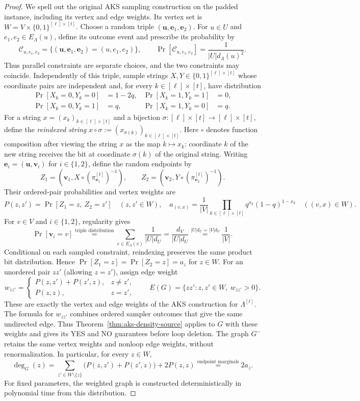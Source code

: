 \begin{proof}
We spell out the original AKS sampling construction
\cite[proof of Theorem~3.1]{AKS2011} on the padded instance,
including its vertex and edge weights.
Its vertex set is $W=V\times\{0,1\}^{[\ell]\times[t]}$.
Choose a random triple $(\mathbf u,\mathbf e_1,\mathbf e_2)$.
For $u\in U$ and $e_1,e_2\in E_\Lambda(u)$, define its outcome event
and prescribe its probability by
\[
\mathcal C_{u,e_1,e_2}
 =\{(\mathbf u,\mathbf e_1,\mathbf e_2)=(u,e_1,e_2)\},
 \qquad \Pr[\mathcal C_{u,e_1,e_2}]=\frac{1}{|U|d_\Lambda(u)^2}.
\]
Thus parallel constraints are separate choices, and the two constraints
may coincide. Independently of this triple, sample strings
$X,Y\in\{0,1\}^{[\ell]\times[t]}$ whose coordinate pairs are independent
and, for every $k\in[\ell]\times[t]$, have distribution
\[
\begin{aligned}
 \Pr[X_k=0,Y_k=0]&=1-2q,& \Pr[X_k=1,Y_k=1]&=0,\\
 \Pr[X_k=0,Y_k=1]&=q,& \Pr[X_k=1,Y_k=0]&=q.
\end{aligned}
\]
For a string $x=(x_k)_{k\in[\ell]\times[t]}$ and a bijection
$\sigma:[\ell]\times[t]\to[\ell]\times[t]$, define the \emph{reindexed string}
$x\circ\sigma:=(x_{\sigma(k)})_{k\in[\ell]\times[t]}$.
Here $\circ$ denotes function composition after viewing the string $x$
as the map $k\mapsto x_k$: coordinate $k$ of the new string receives
the bit at coordinate $\sigma(k)$ of the original string.
Writing $\mathbf e_i=(\mathbf u,\mathbf v_i)$ for $i\in\{1,2\}$,
define the random endpoints by
\[
 Z_1=(\mathbf v_1,X\circ(\pi_{\mathbf e_1}^{[t]})^{-1}),\qquad
 Z_2=(\mathbf v_2,Y\circ(\pi_{\mathbf e_2}^{[t]})^{-1}).
\]
Their ordered-pair probabilities and vertex weights are
\[
P(z,z')=\Pr[Z_1=z,\ Z_2=z']\quad(z,z'\in W),\quad a_{(v,x)}=\frac{1}{|V|}
 \prod_{k\in[\ell]\times[t]}q^{x_k}(1-q)^{1-x_k}
 \quad((v,x)\in W).
\]
For $v\in V$ and $i\in\{1,2\}$, regularity gives
\[
 \Pr[\mathbf v_i=v]
 \overset{\text{triple distribution}}{=}
 \sum_{e\in E_\Lambda(v)}\frac1{|U|d_U}
 =\frac{d_V}{|U|d_U}
 \overset{|U|d_U=|V|d_V}{=}\frac1{|V|}.
\]
Conditional on each sampled constraint, reindexing preserves the
same product bit distribution. Hence
$\Pr[Z_1=z]=\Pr[Z_2=z]=a_z$ for $z\in W$.
For an unordered pair $zz'$ (allowing $z=z'$), assign edge weight
\[
 w_{zz'}=
 \begin{cases}
  P(z,z')+P(z',z),&z\ne z',\\
  P(z,z),&z=z',
 \end{cases}
 \qquad
 E(G)=\{zz':z,z'\in W,\ w_{zz'}>0\}.
\]
These are exactly the vertex and edge weights of the AKS construction
for $\Lambda^{[t]}$. The formula for $w_{zz'}$ combines ordered sampler
outcomes that give the same undirected edge.
Thus Theorem~\ref{thm:aks-density-source} applies
to $G$ with these weights and gives its YES and NO guarantees before
loop deletion. The graph $G^-$ retains the same vertex weights and
nonloop edge weights, without renormalization.
In particular, for every $z\in W$,
\[
 \deg_G(z)
 =\sum_{z'\in W\setminus\{z\}}\bigl(P(z,z')+P(z',z)\bigr)+2P(z,z)
 \overset{\text{endpoint marginals}}{=}2a_z.
\]
For fixed parameters, the weighted graph is constructed
deterministically in polynomial time from this distribution.


\end{proof}
